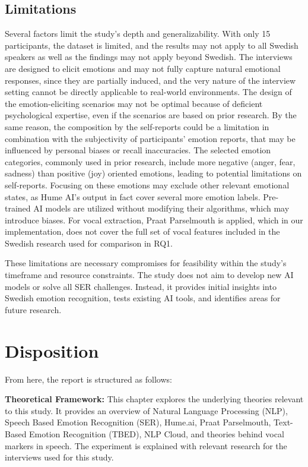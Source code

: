 \subsection{Limitations}
Several factors limit the study’s depth and generalizability. With only 15 participants, the dataset is limited, and the results may not apply to all Swedish speakers as well as the findings may not apply beyond Swedish. The interviews are designed to elicit emotions and may not fully capture natural emotional responses, since they are partially induced, and the very nature of the interview setting cannot be directly applicable to real-world environments. The design of the emotion-eliciting scenarios may not be optimal because of deficient psychological expertise, even if the scenarios are based on prior research. By the same reason, the composition by the self-reports could be a limitation in combination with the subjectivity of participants’ emotion reports, that may be influenced by personal biases or recall inaccuracies. The selected emotion categories, commonly used in prior research, include more negative (anger, fear, sadness) than positive (joy) oriented emotions, leading to potential limitations on self-reports. Focusing on these emotions may exclude other relevant emotional states, as Hume AI’s output in fact cover several more emotion labels. Pre-trained AI models are utilized without modifying their algorithms, which may introduce biases. For vocal extraction, Praat Parselmouth is applied, which in our implementation, does not cover the full set of vocal features included in the Swedish research \autocite{Ekberg2023} used for comparison in RQ1. 

These limitations are necessary compromises for feasibility within the study’s timeframe and resource constraints. The study does not aim to develop new AI models or solve all SER challenges. Instead, it provides initial insights into Swedish emotion recognition, tests existing AI tools, and identifies areas for future research. 

\section{Disposition}
From here, the report is structured as follows: 

\textbf{Theoretical Framework:} This chapter explores the underlying theories relevant to this study. It provides an overview of Natural Language Processing (NLP), Speech Based Emotion Recognition (SER), Hume.ai, Praat Parselmouth, Text-Based Emotion Recognition (TBED), NLP Cloud, and theories behind vocal markers in speech. The experiment is explained with relevant research for the interviews used for this study. 

